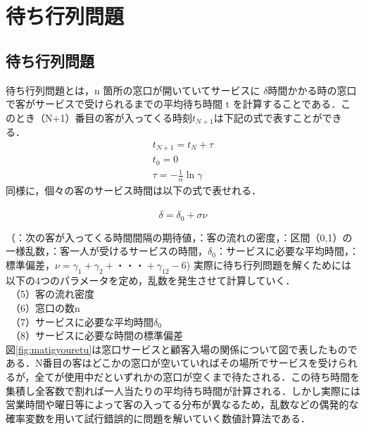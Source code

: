 \documentclass[12pt,a4j]{ltjsarticle}
\begin{document}
\clearpage

\section{ 待ち行列問題}
\subsection{待ち行列問題}
待ち行列問題とは，n 箇所の窓口が開いていてサービスに $\delta$時間かかる時の窓口で客がサービスで受けられるまでの平均待ち時間 t を計算することである．このとき（N+1）番目の客が入ってくる時刻$t_{N+1}$は下記の式で表すことができる．\\

\begin{eqnarray}
t_{N+1}=t_N+\tau\\
t_0=0\\　
\tau=-\frac{1}{\alpha}\ln\gamma
\end{eqnarray}
同様に，個々の客のサービス時間は以下の式で表せれる．\\　
\begin{equation}
\delta=\delta_0+\sigma\nu
\end{equation}

（\tau：次の客が入ってくる時間間隔の期待値，\alpha：客の流れの密度，\gamma：区間（0,1）の一様乱数，\delta：客一人が受けるサービスの時間，$\delta_0$：サービスに必要な平均時間，\sigma：標準偏差，$\nu=\gamma_1+\gamma_2+・・・+\gamma_{12}-6$)
実際に待ち行列問題を解くためには以下の4つのパラメータを定め，乱数を発生させて計算していく．\\
　（5）客の流れ密度\alpha\\
　（6）窓口の数n\\
　（7）サービスに必要な平均時間$\delta_0$\\
　（8）サービスに必要な時間の標準偏差\sigma\\

図\ref{fig:matigyouretu}は窓口サービスと顧客入場の関係について図で表したものである．N番目の客はどこかの窓口が空いていればその場所でサービスを受けられるが，全てが使用中だといずれかの窓口が空くまで待たされる．この待ち時間を集積し全客数で割れば一人当たりの平均待ち時間が計算される．しかし実際には営業時間や曜日等によって客の入ってる分布が異なるため，乱数などの偶発的な確率変数を用いて試行錯誤的に問題を解いていく数値計算法である．
\end{document}
